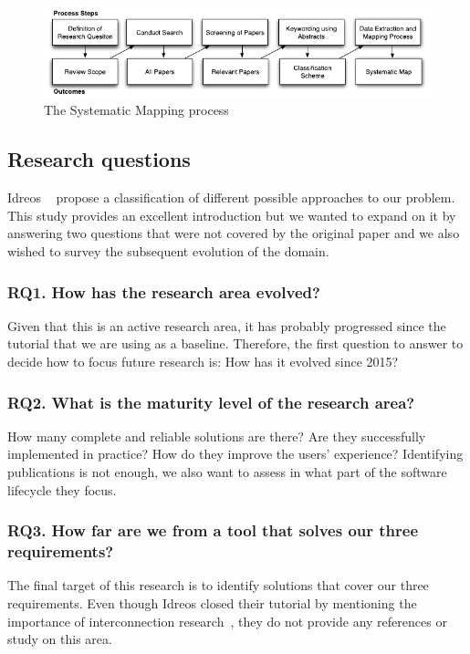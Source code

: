 \begin{figure}[ht]
    \centering
    \includegraphics{images/2_mapping/systematicmapping_diagram}
    \caption{The Systematic Mapping process~\cite{Petersen2007}}
    \label{fig:systematicmapping_diagram}
\end{figure}

\subsection{Research questions}
\label{sec:mapping/research_questions}

Idreos \etal~\cite{Idreos2015} propose a classification of different possible approaches
to our problem.
This study provides an excellent introduction but we wanted to expand on it by answering
two questions that were not covered by the original paper and we also wished to survey
the subsequent evolution of the domain.

\subsubsection{RQ1. How has the research area evolved?}
Given that this is an active research area, it has probably progressed since
the tutorial that we are using as a baseline. Therefore, the first
question to answer to decide how to focus future research is:
How has it evolved since 2015?

\subsubsection{RQ2. What is the maturity level of the research area?}
How many complete and reliable solutions are there?
Are they successfully implemented in practice?
How do they improve the users' experience? Identifying publications is not enough,
we also want to assess in what part of the software lifecycle they focus.

\subsubsection{RQ3. How far are we from a tool that solves our three requirements?}
The final target of this research is to identify solutions that cover our three
requirements.
Even though Idreos closed their tutorial by
mentioning the importance of interconnection research~\cite{Idreos2015}, they do not provide
any references or study on this area.

